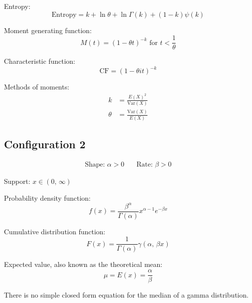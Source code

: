 \documentclass[12pt]{article}
\begin{document}
Entropy:
\begin{equation}\label{eq:gamma-entropy-1}
	\text{Entropy} = k + \ln{\theta} + \ln{\Gamma(k)} + (1-k)\psi(k)
\end{equation}

Moment generating function:
\begin{equation}\label{eq:gamma-mgf-1}
	M(t) = (1-\theta t)^{-k}\text{ for }t < \frac{1}{\theta}
\end{equation}

Characteristic function:
\begin{equation}\label{eq:gamma-cf-1}
	\text{CF} = (1-\theta it)^{-k}
\end{equation}

Methods of moments:
\begin{equation}\label{eq:gamma-mom-1}
	\begin{split}
		k		&=	\frac{E(X)^2}{\text{Var}(X)}\\
		\theta	&=	\frac{\text{Var}(X)}{E(X)}
	\end{split}
\end{equation}

\pagebreak
\subsection{Configuration 2}
\begin{align*}
	\text{Shape: } \alpha>0&&\, \text{Rate: }\beta>0
\end{align*}

Support: $x\in (0,\,\infty)$

Probability density function:
\begin{equation}\label{eq:gamma-pdf-2}
	f(x) = \frac{\beta^\alpha}{\Gamma(\alpha)}x^{\alpha-1}e^{-\beta x}
\end{equation}

Cumulative distribution function:
\begin{equation}\label{eq:gamma-cdf-2}
	F(x) = \frac{1}{\Gamma(\alpha)}\gamma(\alpha,\, \beta x)
\end{equation}

Expected value, also known as the theoretical mean:
\begin{equation}\label{eq:gamma-expected-value-2}
	\mu = E(x) = \frac{\alpha}{\beta}
\end{equation}

There is no simple closed form equation for the median of a gamma distribution.
\end{document}
